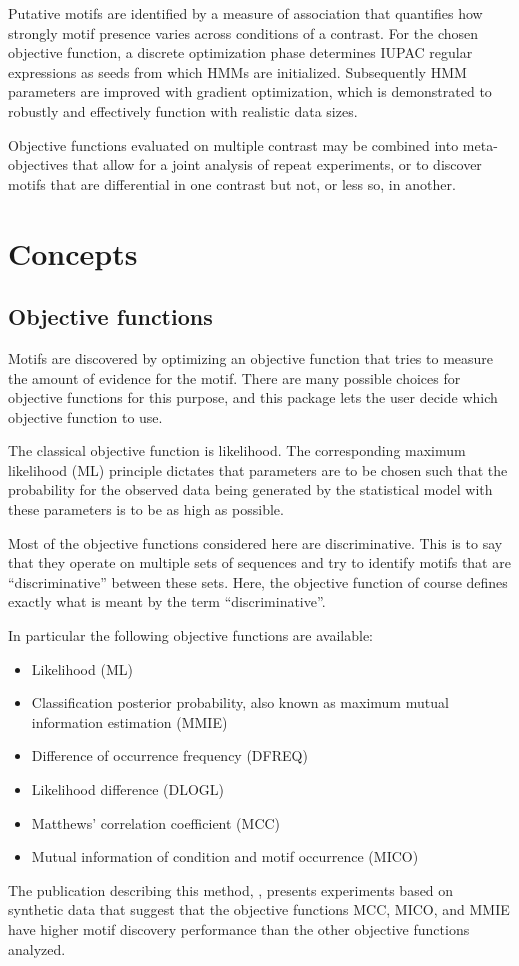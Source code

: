 \documentclass[a4paper]{article}
\begin{document}
Putative motifs are identified by a measure of association that quantifies how strongly motif presence varies across conditions of a contrast.
For the chosen objective function, a discrete optimization phase determines IUPAC regular expressions as seeds from which HMMs are initialized.
Subsequently HMM parameters are improved with gradient optimization, which is demonstrated to robustly and effectively function with realistic data sizes.

Objective functions evaluated on multiple contrast may be combined into meta-objectives that allow for a joint analysis of repeat experiments, or to discover motifs that are differential in one contrast but not, or less so, in another.

\section{Concepts}
\subsection{Objective functions}
Motifs are discovered by optimizing an objective function that tries to measure the amount of evidence for the motif.
There are many possible choices for objective functions for this purpose, and this package lets the user decide which objective function to use.

The classical objective function is likelihood.
The corresponding maximum likelihood (ML) principle dictates that parameters are to be chosen such that the probability for the observed data being generated by the statistical model with these parameters is to be as high as possible.

Most of the objective functions considered here are discriminative.
This is to say that they operate on multiple sets of sequences and try to identify motifs that are ``discriminative'' between these sets.
Here, the objective function of course defines exactly what is meant by the term ``discriminative''.

In particular the following objective functions are available:
\begin{itemize}
  \item Likelihood (ML)
  \item Classification posterior probability, also known as maximum mutual information estimation (MMIE)
  \item Difference of occurrence frequency (DFREQ)
  \item Likelihood difference (DLOGL)
  \item Matthews' correlation coefficient (MCC)
  \item Mutual information of condition and motif occurrence (MICO)
\end{itemize}
The publication describing this method, \cite{Maaskola2014}, presents experiments based on synthetic data that suggest that the objective functions MCC, MICO, and MMIE have higher motif discovery performance than the other objective functions analyzed.
\end{document}
